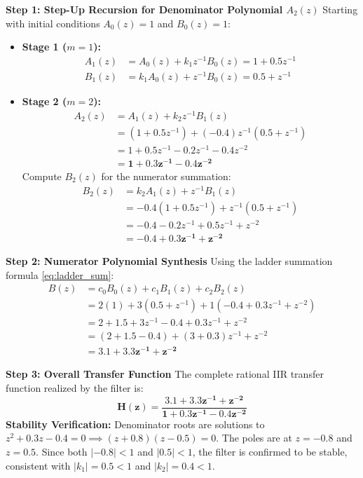 \documentclass[11pt,a4paper]{article}
\begin{document}
\vspace{1mm}
\noindent\textbf{Step 1: Step-Up Recursion for Denominator Polynomial $A_2(z)$}
Starting with initial conditions $A_0(z) = 1$ and $B_0(z) = 1$:
\begin{itemize}
    \item \textbf{Stage 1 ($m = 1$):}
    \begin{align}
    A_1(z) &= A_0(z) + k_1 z^{-1} B_0(z) = 1 + 0.5 z^{-1} \\
    B_1(z) &= k_1 A_0(z) + z^{-1} B_0(z) = 0.5 + z^{-1}
    \end{align}
    \item \textbf{Stage 2 ($m = 2$):}
    \begin{align}
    A_2(z) &= A_1(z) + k_2 z^{-1} B_1(z) \nonumber \\
    &= (1 + 0.5 z^{-1}) + (-0.4) z^{-1} (0.5 + z^{-1}) \nonumber \\
    &= 1 + 0.5 z^{-1} - 0.2 z^{-1} - 0.4 z^{-2} \nonumber \\
    &= \mathbf{1 + 0.3 z^{-1} - 0.4 z^{-2}}
    \end{align}
    Compute $B_2(z)$ for the numerator summation:
    \begin{align}
    B_2(z) &= k_2 A_1(z) + z^{-1} B_1(z) \nonumber \\
    &= -0.4(1 + 0.5 z^{-1}) + z^{-1}(0.5 + z^{-1}) \nonumber \\
    &= -0.4 - 0.2 z^{-1} + 0.5 z^{-1} + z^{-2} \nonumber \\
    &= \mathbf{-0.4 + 0.3 z^{-1} + z^{-2}}
    \end{align}
\end{itemize}

\vspace{1mm}
\noindent\textbf{Step 2: Numerator Polynomial Synthesis}
Using the ladder summation formula \eqref{eq:ladder_sum}:
\begin{align}
B(z) &= c_0 B_0(z) + c_1 B_1(z) + c_2 B_2(z) \nonumber \\
&= 2(1) + 3(0.5 + z^{-1}) + 1(-0.4 + 0.3 z^{-1} + z^{-2}) \nonumber \\
&= 2 + 1.5 + 3 z^{-1} - 0.4 + 0.3 z^{-1} + z^{-2} \nonumber \\
&= (2 + 1.5 - 0.4) + (3 + 0.3) z^{-1} + z^{-2} \nonumber \\
&= \mathbf{3.1 + 3.3 z^{-1} + z^{-2}}
\end{align}

\vspace{1mm}
\noindent\textbf{Step 3: Overall Transfer Function}
The complete rational IIR transfer function realized by the filter is:
\begin{equation}
\mathbf{H(z) = \frac{3.1 + 3.3 z^{-1} + z^{-2}}{1 + 0.3 z^{-1} - 0.4 z^{-2}}}
\end{equation}
\textbf{Stability Verification:} Denominator roots are solutions to $z^2 + 0.3 z - 0.4 = 0 \implies (z + 0.8)(z - 0.5) = 0$. The poles are at $z = -0.8$ and $z = 0.5$. Since both $|-0.8| < 1$ and $|0.5| < 1$, the filter is confirmed to be stable, consistent with $|k_1| = 0.5 < 1$ and $|k_2| = 0.4 < 1$.
\end{document}
